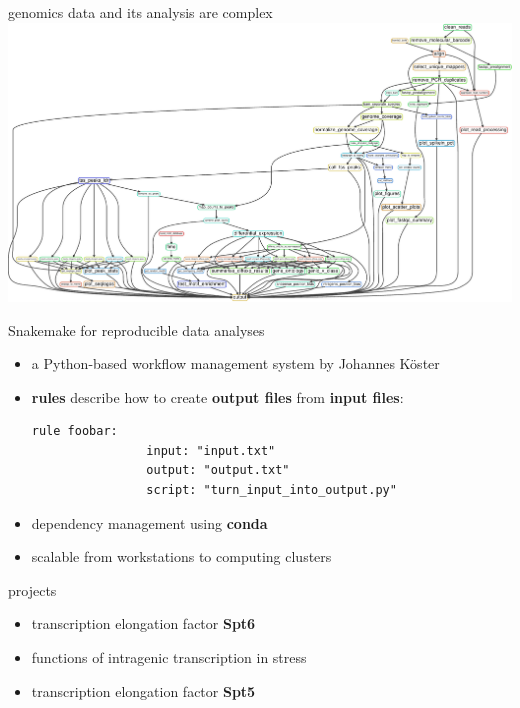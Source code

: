 \documentclass[aspectratio=169]{beamer}
\begin{document}
\begin{frame}{genomics data and its analysis are complex}
\includegraphics[width=\textwidth]{figures/rulegraph.pdf}
\end{frame}

\begin{frame}[fragile]{Snakemake for reproducible data analyses}
    \begin{itemize}
        \item a Python-based workflow management system by Johannes Köster
        \item \textbf{rules} describe how to create \textbf{output files} from \textbf{input files}:
            \begin{lstlisting}[backgroundcolor = \color{light-gray}]
            rule foobar:
                input: "input.txt"
                output: "output.txt"
                script: "turn_input_into_output.py"
            \end{lstlisting}
        \item dependency management using \textbf{conda}
        \item scalable from workstations to computing clusters
    \end{itemize}
\end{frame}

\begin{frame}{projects}
    \begin{itemize}[]
        \setlength{\itemsep}{1cm}
        \item transcription elongation factor \textbf{Spt6}
        \item functions of intragenic transcription in stress
        \item transcription elongation factor \textbf{Spt5}
    \end{itemize}
\end{frame}
\end{document}
